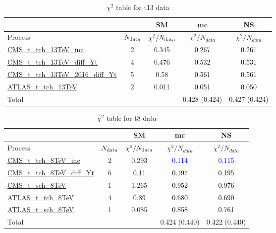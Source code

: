 \documentclass{article}
\begin{document}
\begin{table}[H]
\centering
\begin{tabular}{|l|c|c|c|c|}
\hline
 \multicolumn{2}{|c|}{} & SM& mc& NS\\ \hline
Process & $N_{\rm data}$ & $\chi^ 2/N_{\rm data}$& $\chi^ 2/N_{data}$& $\chi^ 2/N_{data}$\\ \hline
\href{https://arxiv.org/abs/1610.00678}{CMS_t_tch_13TeV_inc} & 2 & 0.345 & \textcolor{black}{0.267} & \textcolor{black}{0.261} \\ \hline
\href{https://cds.cern.ch/record/2151074}{CMS_t_tch_13TeV_diff_Yt} & 4 & 0.476 & \textcolor{black}{0.532} & \textcolor{black}{0.531} \\ \hline
\href{https://arxiv.org/abs/1907.08330}{CMS_t_tch_13TeV_2016_diff_Yt} & 5 & 0.58 & \textcolor{black}{0.561} & \textcolor{black}{0.561} \\ \hline
\href{https://arxiv.org/abs/1609.03920}{ATLAS_t_tch_13TeV} & 2 & 0.011 & \textcolor{black}{0.051} & \textcolor{black}{0.050} \\ \hline
\hline Total & &  & 0.428 (0.424) & 0.427 (0.424) \\ \hline
\end{tabular}
\caption{$\chi^2$ table for t13 data}
\end{table}
\begin{table}[H]
\centering
\begin{tabular}{|l|c|c|c|c|}
\hline
 \multicolumn{2}{|c|}{} & SM& mc& NS\\ \hline
Process & $N_{\rm data}$ & $\chi^ 2/N_{\rm data}$& $\chi^ 2/N_{data}$& $\chi^ 2/N_{data}$\\ \hline
\href{https://arxiv.org/abs/1403.7366}{CMS_t_tch_8TeV_inc} & 2 & 0.293 & \textcolor{blue}{0.114} & \textcolor{blue}{0.115} \\ \hline
\href{https://cds.cern.ch/record/1956681}{CMS_t_tch_8TeV_diff_Yt} & 6 & 0.11 & \textcolor{black}{0.197} & \textcolor{black}{0.195} \\ \hline
\href{https://arxiv.org/abs/1603.02555}{CMS_t_sch_8TeV} & 1 & 1.265 & \textcolor{black}{0.952} & \textcolor{black}{0.976} \\ \hline
\href{https://arxiv.org/abs/1702.02859}{ATLAS_t_tch_8TeV} & 4 & 0.89 & \textcolor{black}{0.680} & \textcolor{black}{0.690} \\ \hline
\href{https://arxiv.org/abs/1511.05980}{ATLAS_t_sch_8TeV} & 1 & 0.085 & \textcolor{black}{0.858} & \textcolor{black}{0.761} \\ \hline
\hline Total & &  & 0.424 (0.440) & 0.422 (0.440) \\ \hline
\end{tabular}
\caption{$\chi^2$ table for t8 data}
\end{table}
\end{document}

